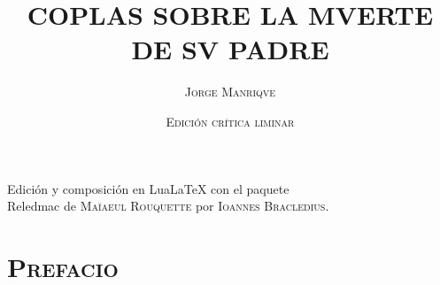 \documentclass[11pt,a4paper,twoside]{article}
\title{\huge \textbf{COPLAS SOBRE LA MVERTE DE SV PADRE}}
\author{\huge\textsc{Jorge Manriqve}}
\date{\vspace{60pt} \textsc{Edición crítica liminar}\\\fontsize{40}{11}\selectfont{\vfill\LaTeX}}
\begin{document}
	{
	\maketitle
}
	\newpage
%
\hskip0pt
\vfill
\begin{flushright}
Edición y composición en LuaLaTeX con el paquete\\ Reledmac de \textsc{Maïaeul Rouquette} por \textsc{Ioannes Bracledius}.
\end{flushright}
\newpage
%
\tableofcontents
\newpage
%
\setcounter{page}{1}
\section*{\centering \textsc{Prefacio}}
\end{document}
